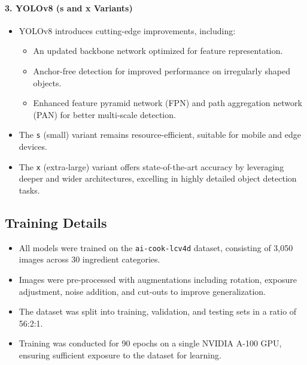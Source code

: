 \documentclass[letterpaper,11pt]{report}
\begin{document}
\paragraph{3. YOLOv8 (s and x Variants)}
\begin{itemize}
    \item YOLOv8 introduces cutting-edge improvements, including:
          \begin{itemize}
              \item An updated backbone network optimized for feature representation.
              \item Anchor-free detection for improved performance on irregularly shaped objects.
              \item Enhanced feature pyramid network (FPN) and path aggregation network (PAN) for better multi-scale detection.
          \end{itemize}
    \item The \texttt{s} (small) variant remains resource-efficient, suitable for mobile and edge devices.
    \item The \texttt{x} (extra-large) variant offers state-of-the-art accuracy by leveraging deeper and wider architectures, excelling in highly detailed object detection tasks.
\end{itemize}

\subsection{Training Details}
\begin{itemize}
    \item All models were trained on the \texttt{ai-cook-lcv4d} dataset, consisting of 3,050 images across 30 ingredient categories.
    \item Images were pre-processed with augmentations including rotation, exposure adjustment, noise addition, and cut-outs to improve generalization.
    \item The dataset was split into training, validation, and testing sets in a ratio of 56:2:1.
    \item Training was conducted for 90 epochs on a single NVIDIA A-100 GPU, ensuring sufficient exposure to the dataset for learning.
\end{itemize}
\end{document}
